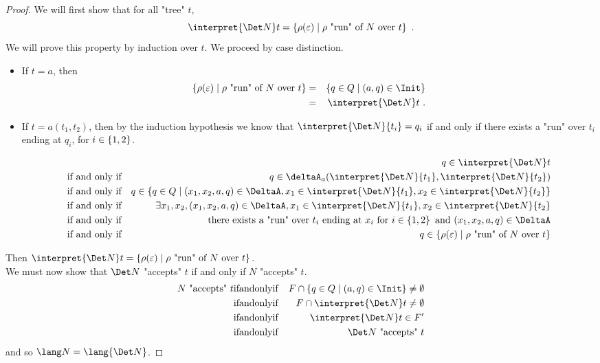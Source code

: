 \documentclass[a4paper,UKenglish,cleveref, autoref, thm-restate]{lipics-v2021}
\begin{document}
\begin{proof}
	We will first show that for all "tree" $t$,
	\[
		\interpret {\Det N} t = \setdef {\rho(\varepsilon)}{\text{$\rho$ "run" of~$N$ over~$t$}}\ .
	\]
	We will prove this property by induction over $t$. We proceed by case distinction.
	\begin{itemize}
		\item If $t = a$, then
		      \begin{eqnarray*}
			      \setdef {\rho(\varepsilon)}{\text{$\rho$ "run" of~$N$ over~$t$}} &=&  \setdef {q \in Q} {(a,q) \in \Init} \\
			      &=& \interpret {\Det N} t\ .
		      \end{eqnarray*}
		\item If $t = a(t_1,t_2)$, then
		      by the induction hypothesis we know that
		      $\interpret {\Det N} {t_i} = q_i$ if and only if there exists a "run" over $t_i$ ending at $q_i$, for $i \in \left\{1,2\right\}$.

		      \begin{eqnarray*}
			      &&q \in \interpret {\Det N} t \\
			      &\text{if and only if}& q \in \deltaA_a (\interpret {\Det N} {t_1}, \interpret {\Det N} {t_2}) \\
			      &\text{if and only if}& q \in \setdef {q \in  Q} {(x_1,x_2,a,q) \in \DeltaA, x_1 \in \interpret {\Det N} {t_1}, x_2 \in \interpret {\Det N} {t_2}} \\
			      &\text{if and only if}& \exists x_1,x_2, (x_1,x_2,a,q) \in \DeltaA, x_1 \in \interpret {\Det N} {t_1}, x_2 \in \interpret {\Det N} {t_2} \\
			      &\text{if and only if}& \text{there exists a "run" over }  t_i  \text { ending at } x_i \text { for  } i \in \set {1,2} \text{ and } (x_1,x_2,a,q) \in \DeltaA\\
			      &\text{if and only if}& q \in \setdef {\rho(\varepsilon)}{\text{$\rho$ "run" of~$N$ over~$t$}}
		      \end{eqnarray*}
	\end{itemize}
	Then $ \interpret {\Det N} t = \setdef {\rho(\varepsilon)}{\text{$\rho$ "run" of~$N$ over~$t$}}$.\\

	We must now show that $\Det N$ "accepts" $t$ if and only if $N$ "accepts" $t$.
	\begin{eqnarray*}
		N \text{ "accepts" } t &\tiff& F \cap \setdef {q \in Q} {(a,q) \in \Init} \neq \emptyset \\
		&\tiff&   F \cap  \interpret {\Det N} t \neq \emptyset \\
		&\tiff& \interpret {\Det N} t  \in F' \\
		&\tiff& {\Det N} \text{ "accepts" } t
	\end{eqnarray*}
	and so $\lang N = \lang {\Det N}$.
\end{proof}
\end{document}
